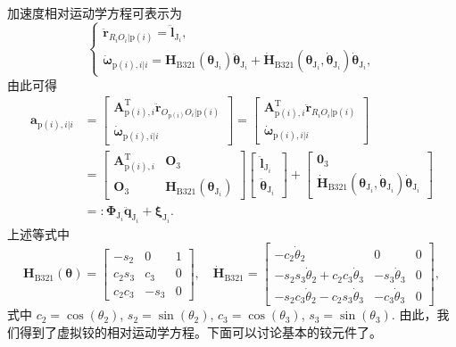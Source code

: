 加速度相对运动学方程可表示为
\[
\begin{cases}
\ddot{\boldsymbol{r}}_{R_i O_i|\mathrm{p}(i)} = \ddot{\boldsymbol{l}}_{\mathrm{J}_i},\\[6pt]
\dot{\boldsymbol{\omega}}_{\mathrm{p}(i),i|i} = \boldsymbol{H}_{\mathrm{B321}}(\boldsymbol{\theta}_{\mathrm{J}_i}) \ddot{\boldsymbol{\theta}}_{\mathrm{J}_i} + \dot{\boldsymbol{H}}_{\mathrm{B321}}(\boldsymbol{\theta}_{\mathrm{J}_i}, \dot{\boldsymbol{\theta}}_{\mathrm{J}_i}) \dot{\boldsymbol{\theta}}_{\mathrm{J}_i},
\end{cases}
\]
由此可得
\[
\begin{aligned}
\boldsymbol{a}_{\mathrm{p}(i),i|i}
&= \begin{bmatrix} \boldsymbol{A}_{\mathrm{p}(i),i}^{\mathrm{T}} \ddot{\boldsymbol{r}}_{O_{\mathrm{p}(i)} O_i|\mathrm{p}(i)} \\ \dot{\boldsymbol{\omega}}_{\mathrm{p}(i),i|i} \end{bmatrix}
 = \begin{bmatrix} \boldsymbol{A}_{\mathrm{p}(i),i}^{\mathrm{T}} \ddot{\boldsymbol{r}}_{R_i O_i|\mathrm{p}(i)} \\ \dot{\boldsymbol{\omega}}_{\mathrm{p}(i),i|i} \end{bmatrix} \\
&= \begin{bmatrix} \boldsymbol{A}_{\mathrm{p}(i),i}^{\mathrm{T}} & \boldsymbol{O}_3 \\ \boldsymbol{O}_3 & \boldsymbol{H}_{\mathrm{B321}}(\boldsymbol{\theta}_{\mathrm{J}_i}) \end{bmatrix} \begin{bmatrix} \ddot{\boldsymbol{l}}_{\mathrm{J}_i} \\ \ddot{\boldsymbol{\theta}}_{\mathrm{J}_i} \end{bmatrix}
 + \begin{bmatrix} \boldsymbol{0}_3 \\ \dot{\boldsymbol{H}}_{\mathrm{B321}}(\boldsymbol{\theta}_{\mathrm{J}_i}, \dot{\boldsymbol{\theta}}_{\mathrm{J}_i}) \dot{\boldsymbol{\theta}}_{\mathrm{J}_i} \end{bmatrix} \\
&=: \boldsymbol{\Phi}_{\mathrm{J}_i} \ddot{\boldsymbol{q}}_{\mathrm{J}_i} + \boldsymbol{\xi}_{\mathrm{J}_i}.
\end{aligned}
\]
上述等式中
\[
\boldsymbol{H}_{\mathrm{B321}}(\boldsymbol{\theta})
=
\begin{bmatrix}
-s_2 & 0 & 1 \\
c_2 s_3 & c_3 & 0 \\
c_2 c_3 & -s_3 & 0
\end{bmatrix},
\quad
\dot{\boldsymbol{H}}_{\mathrm{B321}}
=
\begin{bmatrix}
-c_2 \dot{\theta}_2 & 0 & 0 \\
-s_2 s_3 \dot{\theta}_2 + c_2 c_3 \dot{\theta}_3 & -s_3 \dot{\theta}_3 & 0 \\
-s_2 c_3 \dot{\theta}_2 - c_2 s_3 \dot{\theta}_3 & -c_3 \dot{\theta}_3 & 0
\end{bmatrix},
\]
式中 $c_2 = \cos(\theta_2)$, $s_2 = \sin(\theta_2)$, $c_3 = \cos(\theta_3)$, $s_3 = \sin(\theta_3)$.
由此，我们得到了虚拟铰的相对运动学方程。下面可以讨论基本的铰元件了。
